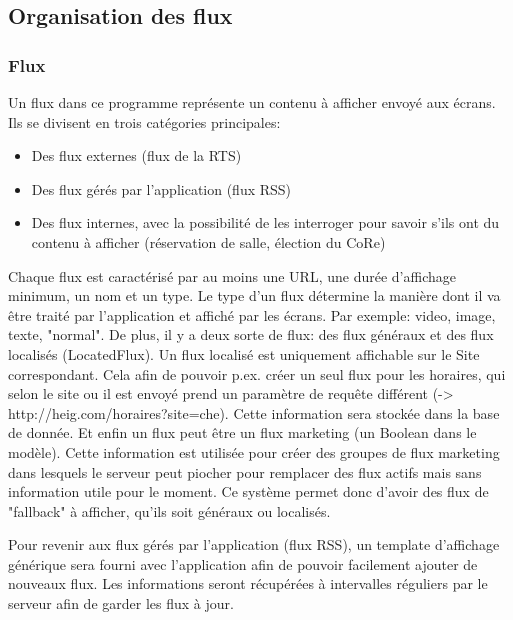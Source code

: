 \documentclass[french]{article}
\begin{document}
\subsection{Organisation des flux}

\subsubsection{Flux}
Un flux dans ce programme représente un contenu à afficher envoyé aux écrans. Ils se divisent en trois catégories principales:
\begin{itemize}
	\item Des flux externes (flux de la RTS)
	\item Des flux gérés par l'application (flux RSS)
	\item Des flux internes, avec la possibilité de les interroger pour savoir s'ils ont du contenu à afficher (réservation de salle, élection du CoRe) 
\end{itemize}
Chaque flux est caractérisé par au moins une URL, une durée d'affichage minimum, un nom et un type. Le type d'un flux détermine la manière dont il va être traité par l'application et affiché par les écrans. Par exemple: video, image, texte, "normal".\newline
De plus, il y a deux sorte de flux: des flux généraux et des flux localisés (LocatedFlux). Un flux localisé est uniquement affichable sur le Site correspondant. Cela afin de pouvoir p.ex. créer un seul flux pour les horaires, qui selon le site ou il est envoyé prend un paramètre de requête différent (-> http://heig.com/horaires?site=che). Cette information sera stockée dans la base de donnée. \newline
Et enfin un flux peut être un flux marketing (un Boolean dans le modèle). Cette information est utilisée pour créer des groupes de flux marketing dans lesquels le serveur peut piocher pour remplacer des flux actifs mais sans information utile pour le moment. Ce système permet donc d'avoir des flux de "fallback" à afficher, qu'ils soit généraux ou localisés. \newline \par
Pour revenir aux flux gérés par l'application (flux RSS), un template d'affichage générique sera fourni avec l'application afin de pouvoir facilement ajouter de nouveaux flux. Les informations seront récupérées à intervalles réguliers par le serveur afin de garder les flux à jour.
\end{document}

